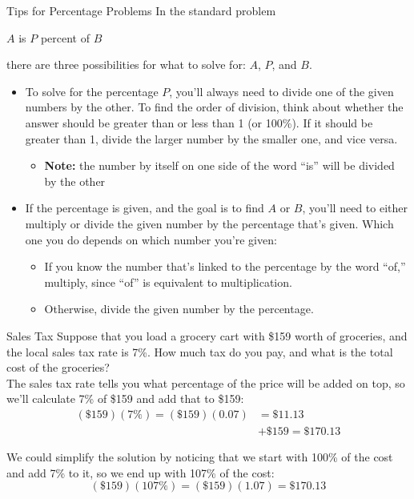 \begin{proc}{Tips for Percentage Problems}
In the standard problem
\begin{center}
$A$ is $P$ percent of $B$
\end{center}
there are three possibilities for what to solve for: $A$, $P$, and $B$.
\begin{itemize}
\item To solve for the percentage $P$, you'll always need to divide one of the given numbers by the other.  To find the order of division, think about whether the answer should be greater than or less than 1 (or 100\%).  If it should be greater than 1, divide the larger number by the smaller one, and vice versa.
\begin{itemize}
\item \textbf{Note:} the number by itself on one side of the word ``is'' will be divided by the other
\end{itemize}
\item If the percentage is given, and the goal is to find $A$ or $B$, you'll need to either multiply or divide the given number by the percentage that's given.  Which one you do depends on which number you're given:
\begin{itemize}
\item If you know the number that's linked to the percentage by the word ``of,'' multiply, since ``of'' is equivalent to multiplication.
\item Otherwise, divide the given number by the percentage.
\end{itemize}
\end{itemize}
\end{proc}
\vfill

\begin{example}[https://www.youtube.com/watch?v=cApv0GeF2XM]{Sales Tax}
Suppose that you load a grocery cart with \$159 worth of groceries, and the local sales tax rate is 7\%. How much tax do you pay, and what is the total cost of the groceries?\\

\sol
The sales tax rate tells you what percentage of the price will be added on top, so we'll calculate 7\% of \$159 and add that to \$159:
\begin{align*}
(\$159)(7\%) = (\$159)(0.07) &= \$11.13\\
&+ \$159 = \boxed{\$170.13}
\end{align*}

We could simplify the solution by noticing that we start with 100\% of the cost and add 7\% to it, so we end up with 107\% of the cost: \[(\$159)(107\%) = (\$159)(1.07) = \$170.13\]
\end{example}
\vfill

